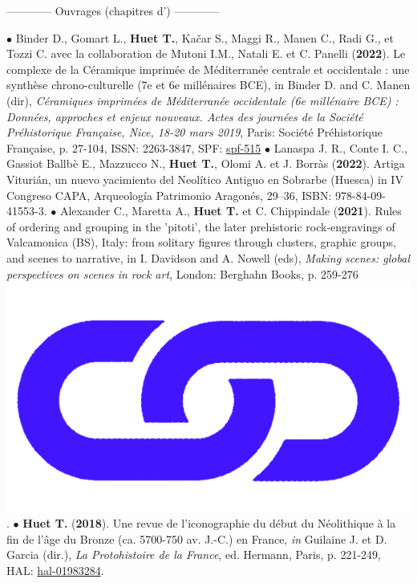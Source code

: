 \documentclass{article}
\begin{document}
\bigbreak
\begin{center}------------ Ouvrages (chapitres d') ------------\end{center}
\smallbreak
$\bullet$ Binder D., Gomart L., \textbf{Huet T.}, Ka{\v{c}}ar S., Maggi R., Manen C., Radi G., et Tozzi C. avec la collaboration de Mutoni I.M., Natali E. et C. Panelli (\textbf{2022}). Le complexe de la C\'{e}ramique imprim\'{e}e de M\'{e}diterran\'{e}e centrale et occidentale : une synthèse chrono-culturelle (7e et 6e millénaires BCE), in Binder D. and C. Manen (dir), \textit{C\'{e}ramiques imprim\'{e}es de M\'{e}diterran\'{e}e occidentale (6e mill\'{e}naire BCE) : Donn\'{e}es, approches et enjeux nouveaux. Actes des journ\'{e}es de la Soci\'{e}t\'{e} Pr\'{e}historique Fran\c{c}aise, Nice, 18-20 mars 2019}, Paris: Soci\'{e}t\'{e} Pr\'{e}historique Fran\c{c}aise, p. 27-104, ISSN: 2263-3847, SPF: \href{https://www.prehistoire.org/515_p_57657/accEs-libre-seance-18-ceramiques-imprimees-de-mediterranee-occidentale.html}{spf-515}
\smallbreak
$\bullet$ Lanaspa J. R., Conte I. C., Gassiot Ballbè E., Mazzucco N., \textbf{Huet T.}, Olomi A. et J. Borràs (\textbf{2022}). Artiga Viturián, un nuevo yacimiento del Neolítico Antiguo en Sobrarbe (Huesca) in IV Congreso CAPA, Arqueología Patrimonio Aragonés, 29–36, ISBN: 978-84-09-41553-3.
\smallbreak
$\bullet$ Alexander C., Maretta A., \textbf{Huet T.} et C. Chippindale (\textbf{2021}). Rules of ordering and grouping in the 'pitoti', the later prehistoric rock-engravings of Valcamonica (BS), Italy: from solitary figures through clusters, graphic groups, and scenes to narrative, in I. Davidson and A. Nowell (eds), \textit{Making scenes: global perspectives on scenes in rock art}, London: Berghahn Books, p. 259-276 \href{https://www.berghahnbooks.com/title/DavidsonMaking}{\includegraphics[scale=0.02]{link_darkblue.png}}.
\smallbreak
$\bullet$ \textbf{Huet T.} (\textbf{2018}). Une revue de l'iconographie du d\'{e}but du N\'{e}olithique \`{a} la fin de l'\^{a}ge du Bronze (ca. 5700-750 av. J.-C.) en France, \textit{in} Guilaine J. et D. Garcia (dir.), \textit{La Protohistoire de la France}, ed. Hermann, Paris, p. 221-249, HAL: \href{https://hal.archives-ouvertes.fr/hal-01983284}{hal-01983284}.
\bigbreak
\end{document}
